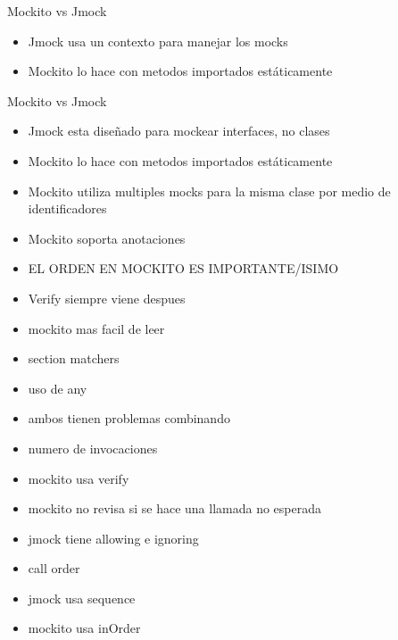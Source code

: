\documentclass[]{beamer}
\begin{document}
\begin{frame}{Mockito vs Jmock}
  \begin{itemize}
  \item Jmock usa un contexto para manejar los mocks
  \item Mockito lo hace con metodos importados estáticamente
  \end{itemize}
\end{frame}

\begin{frame}{Mockito vs Jmock}
  \begin{itemize}
  \item Jmock esta diseñado para mockear interfaces, no clases
  \item Mockito lo hace con metodos importados estáticamente
  \item Mockito utiliza multiples mocks para la misma clase por medio de identificadores
  \item Mockito soporta anotaciones
  \item EL ORDEN EN MOCKITO ES IMPORTANTE/ISIMO
  \item Verify siempre viene despues
  \item mockito mas facil de leer
    \item section matchers
    \item uso de any
    \item ambos tienen problemas combinando
  \item numero de invocaciones
    \item mockito usa verify
    \item mockito no revisa si se hace una llamada no esperada
    \item jmock tiene allowing e ignoring
  \item call order
  \item jmock usa sequence
    \item mockito usa inOrder
  \end{itemize}
  \transboxout
\end{frame}



\end{document}
